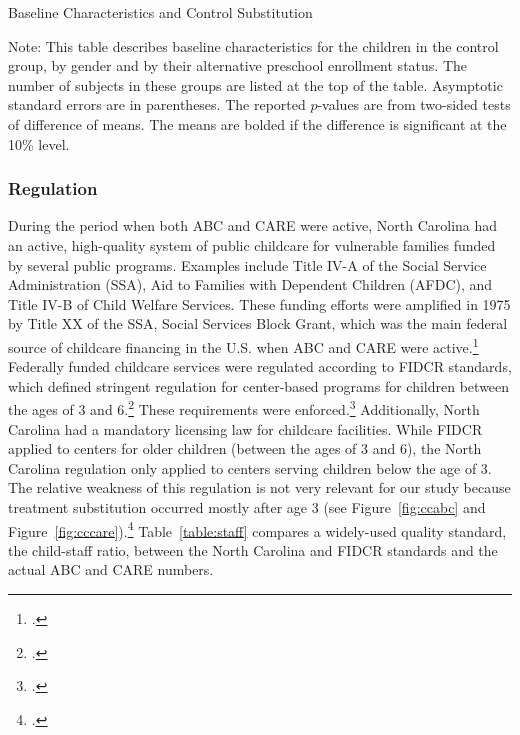 \begin{table}
\centering
\begin{threeparttable}
\caption{Baseline Characteristics and Control Substitution}\label{table:controlsubscharacteristics}

\begin{tablenotes}
\item Note: This table describes baseline characteristics for the children in the control group, by gender and by their alternative preschool enrollment status. The number of subjects in these groups are listed at the top of the table. Asymptotic standard errors are in parentheses. The reported $p$-values are from two-sided tests of difference of means. The means are bolded if the difference is significant at the 10\% level.
\end{tablenotes}
\end{threeparttable}
\end{table}

\subsubsection{Regulation}  \label{appendix:tetanus}

\noindent During the period when both ABC and CARE were active, North Carolina had an active, high-quality system of public childcare for vulnerable families funded by several public programs. Examples include Title IV-A of the Social Service Administration (SSA), Aid to Families with Dependent Children (AFDC), and Title IV-B of Child Welfare Services. These funding efforts were amplified in 1975 by Title XX of the SSA, Social Services Block Grant, which was the main federal source of childcare financing in the U.S. when ABC and CARE were active.\footnote{\citet{Robins_1988_Federal-Child-Care}.}\\

\noindent Federally funded childcare services were regulated according to FIDCR standards, which defined stringent regulation for center-based programs for children between the ages of 3 and 6.\footnote{\citet{Department-of-Health_1968_DayCareRequirements}.} These requirements were enforced.\footnote{\citet{Kuperman_2015_Clifford-Russell-Interview}.} Additionally, North Carolina had a mandatory licensing law for childcare facilities. While FIDCR applied to centers for older children (between the ages of 3 and 6), the North Carolina regulation only applied to centers serving children below the age of 3. The relative weakness of this regulation is not very relevant for our study because treatment substitution occurred mostly after age 3 (see Figure~\ref{fig:ccabc} and Figure~\ref{fig:cccare}).\footnote{\citet{NCGA_1971_House-Bill-100}.} Table~\ref{table:staff} compares a widely-used quality standard, the child-staff ratio, between the North Carolina and FIDCR standards and the actual ABC and CARE numbers. \\

